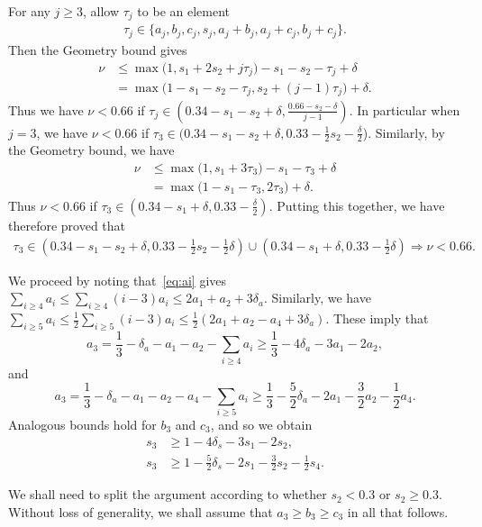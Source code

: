 For any $j\ge3$, allow $\tau_j$ to be an element
\begin{align}\label{eq:taujdef}
\tau_j\in\{a_j,b_j,c_j, s_j, a_j+b_j,a_j+c_j,b_j+c_j\}.
\end{align}
Then the Geometry bound gives
\begin{align*}
\nu & \le \max\big(1, s_1+2s_2+j\tau_j\big)-s_1-s_2-\tau_j +\delta\\
& = \max\big(1-s_1-s_2-\tau_j, s_2+(j-1)\tau_j \big)+\delta.
\end{align*}
Thus we have $\nu< 0.66$ if
$\tau_j\in (0.34-s_1-s_2+\delta, \frac{0.66-s_2-\delta}{j-1})$.
In particular when $j=3$, we have $\nu< 0.66$ if
$\tau_3\in (0.34-s_1-s_2+\delta, 0.33-\frac{1}{2}s_2-\frac{\delta}{2}$).
Similarly, by the Geometry bound, we have
\begin{align*}
\nu & \le \max\big(1, s_1+3\tau_3\big)-s_1-\tau_3+\delta\\
&= \max\big(1-s_1-\tau_3, 2\tau_3\big)+\delta.
\end{align*}
Thus $\nu< 0.66$ if $\tau_3\in (0.34-s_1+\delta, 0.33-\frac{\delta}{2})$.
Putting this together, we have therefore proved that
\begin{align}\label{eq:Geotau3}
\tau_3\in
 \left(0.34-s_1-s_2+\delta,
0.33 -\frac{1}{2}s_2-\frac{1}{2}\delta\right)
\cup
\left(0.34-s_1+\delta, 0.33-\frac{1}{2}\delta\right)
 \Longrightarrow
\nu < 0.66.
\end{align}

We proceed by noting that~\eqref{eq:ai} gives $\sum_{i\ge4}a_i \le \sum_{i\ge4}(i-3)a_i \le 2a_1+a_2+3\delta_a$. Similarly, we have $\sum_{i\ge5}a_i \le \frac{1}{2}\sum_{i\ge5}(i-3)a_i\le\frac{1}{2}(2a_1+a_2-a_4+3\delta_a)$. These imply that
\begin{equation}
a_3 = \frac{1}{3}-\delta_a - a_1-a_2 - \sum_{i\ge4}a_i \ge \frac{1}{3}-4\delta_a - 3a_1 - 2a_2,
\label{eq:black1}
\end{equation}
and
\[
a_3 = \frac{1}{3}-\delta_a - a_1-a_2 - a_4 - \sum_{i\ge5}a_i \ge \frac{1}{3}-\frac{5}{2}\delta_a - 2a_1 - \frac{3}{2}a_2 - \frac{1}{2}a_4.
\]
Analogous bounds hold for $b_3$ and $c_3$, and so we obtain
\begin{align}
s_3 &\ge 1-4\delta_s - 3s_1 - 2s_2, \label{eq:s3>s12}\\
s_3 & \ge 1-\frac{5}{2}\delta_s - 2s_1 - \frac{3}{2}s_2 - \frac{1}{2}s_4.\label{eq:s3>s124}
\end{align}


We shall need to split the argument according to whether $s_2<0.3$ or
$s_2\geq 0.3$.
Without loss of generality, we shall assume that $a_3\ge b_3\ge c_3$ in all that follows.



